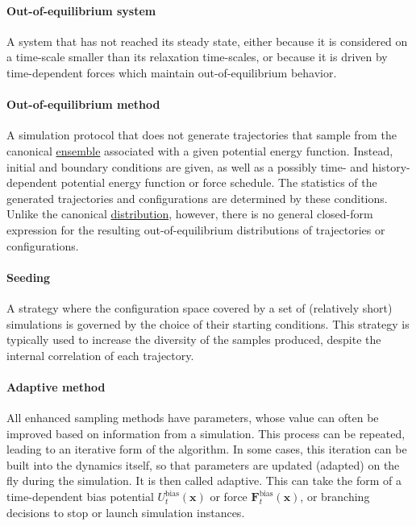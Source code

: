 \documentclass[9pt,review]{livecoms}
\newcommand{\vx}{\mathbf{x}}
\newcommand{\vF}{\mathbf{F}}
\begin{document}
\paragraph{Out-of-equilibrium system} A system that has not reached its steady state, either because it is considered on a time-scale smaller than its relaxation time-scales, or because it is driven by time-dependent forces which maintain out-of-equilibrium behavior.

\hypertarget{ref:OutOfEq} {\paragraph{Out-of-equilibrium method}}
A simulation protocol that does not generate trajectories that sample from the canonical \hyperlink{ref:Ensemble} {ensemble} associated with a given potential energy function.
Instead, initial and boundary conditions are given, as well as a possibly time- and history-dependent potential energy function or force schedule. The statistics of the generated trajectories and configurations are determined by these conditions.
Unlike the canonical \hyperlink{ref:Distribution} {distribution}, however, there is no general closed-form expression for the resulting out-of-equilibrium distributions of trajectories or configurations.

\hypertarget{ref:Seeding} {\paragraph{Seeding}}
A strategy where the configuration space covered by a set of (relatively short) simulations is governed by the choice of their starting conditions. This strategy is typically used to increase the diversity of the samples produced, despite the internal correlation of each trajectory.


\hypertarget{ref:Adaptive} {\paragraph{Adaptive method}}

All enhanced sampling methods have parameters, whose value can often be improved based on information from a simulation.
This process can be repeated, leading to an iterative form of the algorithm.
In some cases, this iteration can be built into the dynamics itself, so that parameters are updated (adapted) on the fly during the simulation. It is then called adaptive.
This can take the form of a time-dependent bias potential $U^\mathrm{bias}_t(\vx)$ or force $\vF^\mathrm{bias}_t(\vx)$, or branching decisions to stop or launch simulation instances.
\end{document}
